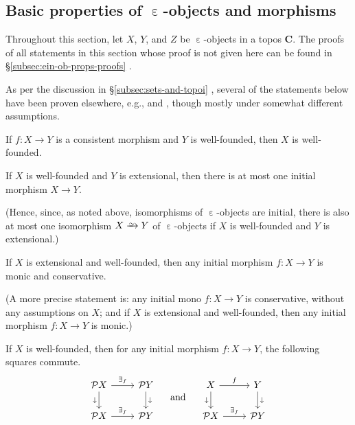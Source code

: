 \documentclass{amsart}
\makeatletter
\newcommand\alttext{\texorpdfstring}
\newcommand\AND{\text{ and }}
\newcommand\bC{\mathbf{C}}
\newcommand\dwn{\mathpunct{\downarrow}}
\newcommand\ein{\mathrel{\varepsilon}}
\newcommand\pow{\mathcal{P}}
\newcommand\toi{\xrightarrow{\raisebox{-2.5pt}[0pt][0pt]{\ensuremath{\scriptstyle{\sim}}}}}
\newcommand\unein{{\ein}}
\newcommand\prooflabel[1]{\gdef\proof@label{#1}}
\def\proof@label{}
\newcommand\prerefpost[3]{%
  \texorpdfstring%
    {\hyperref[#2]{#1\ref*{#2}#3}}%
    {#1\ref*{#2}#3}%
}
\newcommand\sref[1]{\prerefpost{\S}{#1}{}}
\theoremstyle{definition}
\theoremstyle{remark}
\theoremstyle{plainwithref}
\makeatother
\begin{document}
\subsection{Basic properties of \alttext{\( \unein \)}{ε}-objects and morphisms} \label{subsec:ein-ob-props}
Throughout this section, let \( X \), \( Y \), and \( Z \) be \( \unein \)-objects in a topos \( \bC \).
The proofs of all statements in this section whose proof is not given here can be found in \sref{subsec:ein-ob-props-proofs}.

As per the discussion in \sref{subsec:sets-and-topoi}, several of the statements below have been proven elsewhere, e.g., \cite[\S8]{shulman-comparing} and \cite[\S9.2]{johnstone-topos-theory}, though mostly under somewhat different assumptions.

\prooflabel{proof:cons-wf-wf}
\begin{propn} \label{propn:cons-wf-wf}
  If \( f \colon X \to Y \) is a consistent morphism and \( Y \) is well-founded, then \( X \) is well-founded.
\end{propn}

\prooflabel{proof:init-uniq}
\begin{propn} \label{propn:init-uniq}
  If \( X \) is well-founded and \( Y \) is extensional, then there is at most one initial morphism \( X \to Y \).

  \noindent
  (Hence, since, as noted above, isomorphisms of \( \ein \)-objects are initial, there is also at most one isomorphism \( X \toi Y \) of \( \ein \)-objects if \( X \) is well-founded and \( Y \) is extensional.)
\end{propn}

\prooflabel{proof:init-cons-mono}
\begin{propn} \label{propn:init-cons-mono}
  If \( X \) is extensional and well-founded, then any initial morphism \( f \colon X \to Y \) is monic and conservative.

  \noindent
  (A more precise statement is: any initial mono \( f \colon X \to Y \) is conservative, without any assumptions on \( X \); and if \( X \) is extensional and well-founded, then any initial morphism \( f \colon X \to Y \) is monic.)
\end{propn}

\prooflabel{proof:dwn-dwn}
\begin{propn} \label{propn:dwn-dwn}
  If \( X \) is well-founded, then for any initial morphism \( f \colon X \to Y \), the following squares commute.
  \[
    \begin{tikzcd}
      \pow X \ar[r, "\exists_f"] \ar[d, "\dwn"'] & \pow Y \ar[d, "\dwn"] \\
      \pow X \ar[r, "\exists_f"] & \pow Y
    \end{tikzcd}
    \quad\AND\quad
    \begin{tikzcd}
      X \ar[r, "f"] \ar[d, "\dwn"'] & Y \ar[d, "\dwn"] \\
      \pow X \ar[r, "\exists_f"] & \pow Y
    \end{tikzcd}
  \]
\end{propn}
\end{document}
